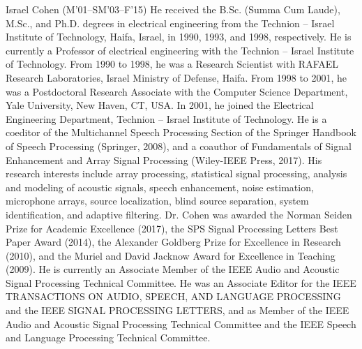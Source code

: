 \documentclass[journal]{IEEEtran}
\begin{document}
\begin{IEEEbiography}{Israel Cohen}
(M’01–SM’03–F’15) He received the B.Sc. (Summa Cum Laude), M.Sc., and Ph.D. degrees in electrical engineering from the Technion – Israel Institute of Technology, Haifa, Israel, in 1990, 1993, and 1998, respectively.
He is currently a Professor of electrical engineering with the Technion – Israel Institute of Technology.
From 1990 to 1998, he was a Research Scientist with RAFAEL Research Laboratories, Israel Ministry of Defense, Haifa. 
From 1998 to 2001, he was a Postdoctoral Research Associate with the Computer Science Department, Yale University, New Haven, CT, USA. In 2001, he joined the Electrical Engineering Department, Technion – Israel Institute of Technology.
He is a coeditor of the Multichannel Speech Processing Section of the Springer Handbook of Speech Processing (Springer, 2008), and a coauthor of Fundamentals of Signal Enhancement and Array Signal Processing (Wiley-IEEE Press, 2017). 
His research interests include array processing, statistical signal processing, analysis and modeling of acoustic signals, speech enhancement, noise estimation, microphone arrays, source localization, blind source separation, system identification, and adaptive filtering.
Dr. Cohen was awarded the Norman Seiden Prize for Academic Excellence (2017), the SPS Signal Processing Letters Best Paper Award (2014), the Alexander Goldberg Prize for Excellence in Research (2010), and the Muriel and David Jacknow Award for Excellence in Teaching (2009). 
He is currently an Associate Member of the IEEE Audio and Acoustic Signal Processing Technical Committee. 
He was an Associate Editor for the IEEE TRANSACTIONS ON AUDIO, SPEECH, AND LANGUAGE PROCESSING and the IEEE SIGNAL PROCESSING LETTERS, and as Member of the IEEE Audio and Acoustic Signal Processing
Technical Committee and the IEEE Speech and Language Processing Technical Committee.
\end{IEEEbiography}
\end{document}
